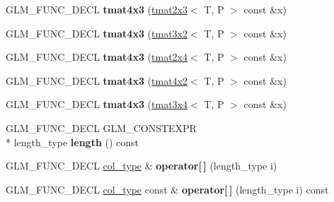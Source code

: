 \begin{DoxyCompactItemize}
\item 
\hypertarget{structglm_1_1tmat4x3_a7f30d4bae817ae942d16d0031a89befc}{G\-L\-M\-\_\-\-F\-U\-N\-C\-\_\-\-D\-E\-C\-L {\bfseries tmat4x3} (\hyperlink{structglm_1_1tmat2x3}{tmat2x3}$<$ T, P $>$ const \&x)}\label{structglm_1_1tmat4x3_a7f30d4bae817ae942d16d0031a89befc}

\item 
\hypertarget{structglm_1_1tmat4x3_acbbc53c87242e5a7b42d92673bfcacbc}{G\-L\-M\-\_\-\-F\-U\-N\-C\-\_\-\-D\-E\-C\-L {\bfseries tmat4x3} (\hyperlink{structglm_1_1tmat3x2}{tmat3x2}$<$ T, P $>$ const \&x)}\label{structglm_1_1tmat4x3_acbbc53c87242e5a7b42d92673bfcacbc}

\item 
\hypertarget{structglm_1_1tmat4x3_af2f3397e1caac21c20ed7295d746f9d1}{G\-L\-M\-\_\-\-F\-U\-N\-C\-\_\-\-D\-E\-C\-L {\bfseries tmat4x3} (\hyperlink{structglm_1_1tmat2x4}{tmat2x4}$<$ T, P $>$ const \&x)}\label{structglm_1_1tmat4x3_af2f3397e1caac21c20ed7295d746f9d1}

\item 
\hypertarget{structglm_1_1tmat4x3_a168940200e9e1ab8805dc8053c4a1f2b}{G\-L\-M\-\_\-\-F\-U\-N\-C\-\_\-\-D\-E\-C\-L {\bfseries tmat4x3} (\hyperlink{structglm_1_1tmat4x2}{tmat4x2}$<$ T, P $>$ const \&x)}\label{structglm_1_1tmat4x3_a168940200e9e1ab8805dc8053c4a1f2b}

\item 
\hypertarget{structglm_1_1tmat4x3_a0f4d778f0ca22be5cac194953c36b996}{G\-L\-M\-\_\-\-F\-U\-N\-C\-\_\-\-D\-E\-C\-L {\bfseries tmat4x3} (\hyperlink{structglm_1_1tmat3x4}{tmat3x4}$<$ T, P $>$ const \&x)}\label{structglm_1_1tmat4x3_a0f4d778f0ca22be5cac194953c36b996}

\item 
\hypertarget{structglm_1_1tmat4x3_acb6956aff90034e96474f71f86ecb97e}{G\-L\-M\-\_\-\-F\-U\-N\-C\-\_\-\-D\-E\-C\-L G\-L\-M\-\_\-\-C\-O\-N\-S\-T\-E\-X\-P\-R \\*
length\-\_\-type {\bfseries length} () const }\label{structglm_1_1tmat4x3_acb6956aff90034e96474f71f86ecb97e}

\item 
\hypertarget{structglm_1_1tmat4x3_a079c5c89aa4fb8235e738b1b4db13fc3}{G\-L\-M\-\_\-\-F\-U\-N\-C\-\_\-\-D\-E\-C\-L \hyperlink{structglm_1_1tvec3}{col\-\_\-type} \& {\bfseries operator\mbox{[}$\,$\mbox{]}} (length\-\_\-type i)}\label{structglm_1_1tmat4x3_a079c5c89aa4fb8235e738b1b4db13fc3}

\item 
\hypertarget{structglm_1_1tmat4x3_a6835adac337993db51d420e9f0da57d3}{G\-L\-M\-\_\-\-F\-U\-N\-C\-\_\-\-D\-E\-C\-L \hyperlink{structglm_1_1tvec3}{col\-\_\-type} const \& {\bfseries operator\mbox{[}$\,$\mbox{]}} (length\-\_\-type i) const }\label{structglm_1_1tmat4x3_a6835adac337993db51d420e9f0da57d3}


\end{DoxyCompactItemize}
